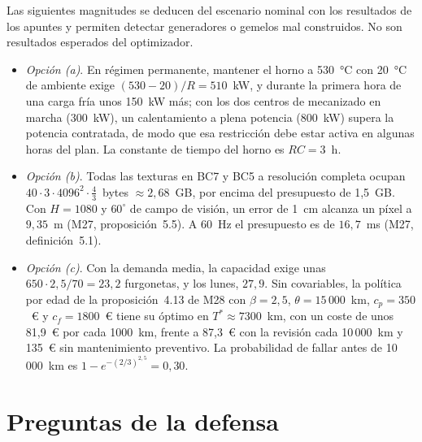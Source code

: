Las siguientes magnitudes se deducen del escenario nominal con los resultados de los apuntes y permiten detectar generadores o gemelos mal construidos. No son resultados esperados del optimizador.
\begin{itemize}[label=\textendash]
  \item \emph{Opción (a)}. En régimen permanente, mantener el horno a 530~°C con 20~°C de ambiente exige $(530-20)/R=510$~kW, y durante la primera hora de una carga fría unos 150~kW más; con los dos centros de mecanizado en marcha (300~kW), un calentamiento a plena potencia (800~kW) supera la potencia contratada, de modo que esa restricción debe estar activa en algunas horas del plan. La constante de tiempo del horno es $RC=3$~h.
  \item \emph{Opción (b)}. Todas las texturas en BC7 y BC5 a resolución completa ocupan $40\cdot 3\cdot 4096^{2}\cdot\tfrac43$~bytes $\approx 2{,}68$~GB, por encima del presupuesto de 1{,}5~GB. Con $H=1080$ y $60^{\circ}$ de campo de visión, un error de 1~cm alcanza un píxel a $9{,}35$~m (M27, proposición~5.5). A 60~Hz el presupuesto es de $16{,}7$~ms (M27, definición~5.1).
  \item \emph{Opción (c)}. Con la demanda media, la capacidad exige unas $650\cdot 2{,}5/70=23{,}2$ furgonetas, y los lunes, $27{,}9$. Sin covariables, la política por edad de la proposición~4.13 de M28 con $\beta=2{,}5$, $\theta=15\,000$~km, $c_p=350$~€ y $c_f=1800$~€ tiene su óptimo en $T^{\ast}\approx 7300$~km, con un coste de unos 81{,}9~€ por cada 1000~km, frente a 87{,}3~€ con la revisión cada 10\,000~km y 135~€ sin mantenimiento preventivo. La probabilidad de fallar antes de 10\,000~km es $1-e^{-(2/3)^{2{,}5}}=0{,}30$.
\end{itemize}

\section{Preguntas de la defensa}

